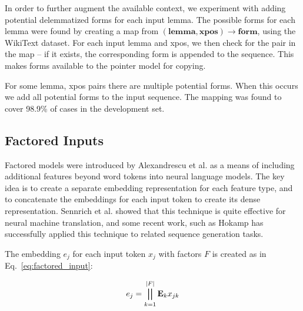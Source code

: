 \documentclass[11pt,a4paper]{article}
\begin{document}


In order to further augment the available context, we experiment with adding potential delemmatized forms for each input lemma. The possible forms for each lemma were found by creating a map from $ (\mathbf{lemma}, \mathbf{xpos}) \rightarrow \mathbf{form}$, using the WikiText dataset. For each input lemma and xpos, we then check for the pair in the map -- if it exists, the corresponding form is appended to the sequence. This makes forms available to the pointer model for copying. 

For some lemma, xpos pairs there are multiple potential forms. When this occurs we add all potential forms to the input sequence. The mapping was found to cover 98.9\% of cases in the development set. 

\subsection{Factored Inputs}

Factored models were introduced by Alexandrescu et al.  as a means of including additional features beyond word tokens into neural language models. The key idea is to create a separate embedding representation for each feature type, and to concatenate the embeddings for each  input token to create its dense representation. Sennrich et al.  showed that this technique is quite effective for neural machine translation, and some recent work, such as Hokamp  has successfully applied this technique to related sequence generation tasks. 

The embedding $ e_{j} $ for each input token $ x_{j} $ with factors $ F $ is created as in  Eq.~\ref{eq:factored_input}:

\begin{equation}
    e_{j} = \bigparallel_{k=1}^{|F|} \mathbf{E}_{k} x_{jk} 
    \label{eq:factored_input}
\end{equation}
\end{document}
